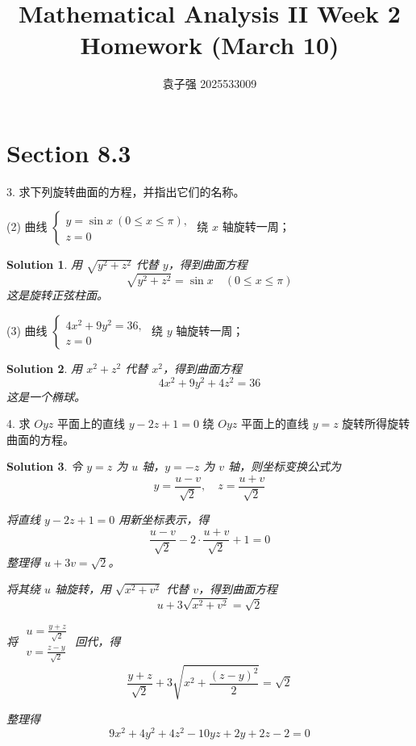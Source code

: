 \documentclass[a4paper,12pt]{article}
\title{Mathematical Analysis II Week 2\\Homework (March 10)}
\author{袁子强\hspace{1cm} 2025533009}
\newtheorem*{sol}{Solution}
\begin{document}
\maketitle

\section*{Section 8.3}

3. 求下列旋转曲面的方程，并指出它们的名称。

(2) 曲线 $\begin{cases}
        y = \sin x\ (0 \leqslant x \leqslant \pi), \\
        z = 0
    \end{cases}$ 绕 $x$ 轴旋转一周；

\begin{sol}
    用 $\sqrt{y^2 + z^2}$ 代替 $y$，得到曲面方程
    $$\sqrt{y^2 + z^2} = \sin x \quad (0 \leqslant x \leqslant \pi)$$
    这是旋转正弦柱面。
\end{sol}

(3) 曲线 $\begin{cases}
        4x^2 + 9y^2 = 36, \\
        z = 0
    \end{cases}$ 绕 $y$ 轴旋转一周；

\begin{sol}
    用 $x^2 + z^2$ 代替 $x^2$，得到曲面方程
    $$4x^2 + 9y^2 + 4z^2 = 36$$
    这是一个椭球。
\end{sol}

4. 求 $Oyz$ 平面上的直线 $y - 2z + 1 = 0$ 绕 $Oyz$ 平面上的直线 $y = z$ 旋转所得旋转曲面的方程。

\begin{sol}
    令 $y = z$ 为 $u$ 轴，$y = -z$ 为 $v$ 轴，则坐标变换公式为
    $$y = \frac{u - v}{\sqrt{2}}, \quad z = \frac{u + v}{\sqrt{2}}$$

    将直线 $y - 2z + 1 = 0$ 用新坐标表示，得
    $$\frac{u - v}{\sqrt{2}} - 2 \cdot \frac{u + v}{\sqrt{2}} + 1 = 0$$
    整理得 $u + 3v = \sqrt{2}$。

    将其绕 $u$ 轴旋转，用 $\sqrt{x^2 + v^2}$ 代替 $v$，得到曲面方程
    $$u + 3\sqrt{x^2 + v^2} = \sqrt{2}$$

    将 $\substack{u = \frac{y + z}{\sqrt{2}} \\ v = \frac{z - y}{\sqrt{2}}}$ 回代，得
    $$\frac{y + z}{\sqrt{2}} + 3\sqrt{x^2 + \frac{(z - y)^2}{2}} = \sqrt{2}$$

    整理得
    $$9x^2 + 4y^2 + 4z^2 - 10yz + 2y + 2z - 2 = 0$$
\end{sol}
\end{document}
